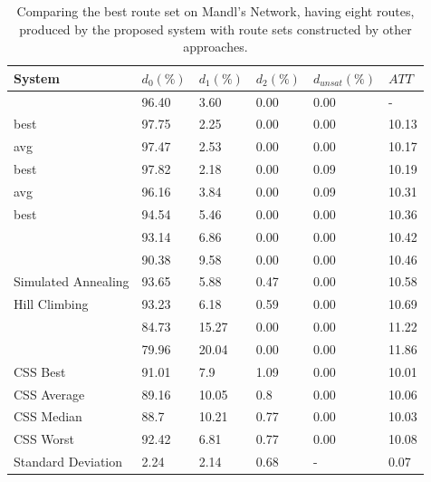     \begin{table}[H]
    \centering
    \hspace*{-1.0cm}
    \begin{tabular}{|l|l|l|l|l|l|}
    \hline
    \textbf{System} & $d_0(\%)$ & $d_1(\%)$ & $d_2(\%)$ & $d_{unsat}(\%)$ & $ATT$ \\
    \hline
    \citet{nikolic14} & 96.40 & 3.60 & 0.00 & 0.00 & - \\
    \citet{kechagiopoulos14} best & 97.75 & 2.25 & 0.00 & 0.00 & 10.13 \\
    \citet{kechagiopoulos14} avg & 97.47 & 2.53 & 0.00 & 0.00 & 10.17 \\
    \citet{chew12} best & 97.82 & 2.18 & 0.00 & 0.09 & 10.19 \\
    \citet{chew12} avg & 96.16 & 3.84 & 0.00 & 0.09 & 10.31 \\
    \citet{fan10} best & 94.54 & 5.46 & 0.00 & 0.00 & 10.36 \\
    \citet{zhang10} & 93.14 & 6.86 & 0.00 & 0.00 & 10.42 \\
    \citet{chakroborty02} & 90.38 & 9.58 & 0.00 & 0.00 & 10.46 \\
    \citet{fan10} Simulated Annealing & 93.65 & 5.88 & 0.47 & 0.00 & 10.58 \\
    \citet{fan10} Hill Climbing & 93.23 & 6.18 & 0.59 & 0.00 & 10.69 \\
    \citet{kidwai98} & 84.73 & 15.27 & 0.00 & 0.00 & 11.22 \\
    \citet{baaj91} & 79.96 & 20.04 & 0.00 & 0.00 & 11.86 \\ 
    \hline
    CSS Best & 91.01 & 7.9 & 1.09 & 0.00 & 10.01\\
    CSS Average & 89.16 & 10.05 & 0.8 & 0.00 & 10.06\\
    CSS Median & 88.7 & 10.21 & 0.77 & 0.00 & 10.03\\
    CSS Worst & 92.42 & 6.81 & 0.77 & 0.00 & 10.08\\
    Standard Deviation & 2.24 & 2.14 & 0.68 & - & 0.07\\
    \hline
    \end{tabular}
    \caption {Comparing the best route set on Mandl's Network, having eight routes, produced by the proposed system with route sets constructed by other approaches.}
    \label{table:performanceComparison_8}
    \end{table}





